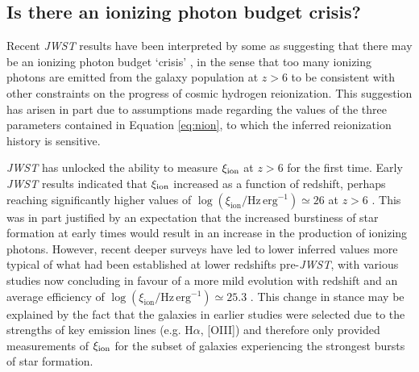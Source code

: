 \documentclass[fleqn,usenatbib]{mnras}
\begin{document}
\subsection{Is there an ionizing photon budget crisis?}
Recent \textit{JWST} results have been interpreted by some as suggesting that there may be an ionizing photon budget `crisis' \citep{munoz2024}, in the sense that too many ionizing photons are emitted from the galaxy population at $z>6$ to be consistent with other constraints on the progress of cosmic hydrogen reionization. 
This suggestion has arisen in part due to assumptions made regarding the values of the three parameters contained in Equation \ref{eq:nion}, to which the inferred reionization history is sensitive. 

\textit{JWST} has unlocked the ability to measure $\xi_{\rm ion}$ at $z>6$ for the first time. Early \textit{JWST} results indicated that $\xi_{\rm ion}$ increased as a function of redshift, perhaps reaching significantly higher values of $\log(\xi_{\mathrm{ion}}/ \mathrm{Hz\, erg^{-1}})\simeq26$ at $z>6$ \citep{simmonds2024a,atek2024}. This was in part justified by an expectation that the increased burstiness of star formation at early times would result in an increase in the production of ionizing photons. However, recent deeper surveys have led to lower inferred values more typical of what had been established at lower redshifts pre-\textit{JWST}, with various studies now concluding in favour of a more mild evolution with redshift and an average efficiency of $\log(\xi_{\mathrm{ion}}/ \mathrm{Hz\, erg^{-1}})\simeq25.3$ \citep{simmonds2024b,pahl2024,begley2024}. This change in stance may be explained by the fact that the galaxies in earlier studies were selected due to the strengths of key emission lines (e.g. H$\alpha$, [OIII]) and therefore only provided measurements of $\xi_{\rm ion}$ for the subset of galaxies experiencing the strongest bursts of star formation.
\end{document}
